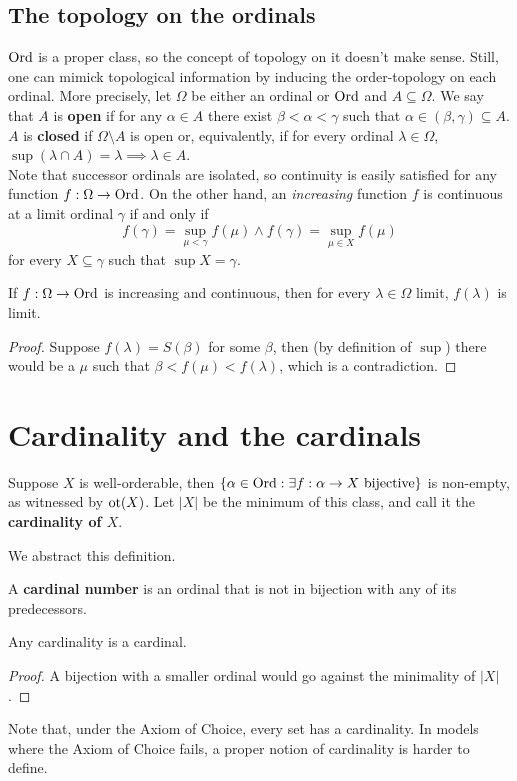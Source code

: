 \documentclass[twoside,openright,titlepage,numbers=noenddot,%
               headinclude,footinclude,cleardoublepage=empty,abstract=on,
               BCOR=23mm,paper=letter,fontsize=11pt
               ]{scrreprt}
\begin{document}
\subsection{The topology on the ordinals}
$\mathrm{Ord}$ is a proper class, so the concept of topology on it doesn't make sense. Still, one can mimick topological information by inducing the order-topology on each ordinal. More precisely, let $\Omega$ be either an ordinal or $\mathrm{Ord}$ and $A \subseteq \Omega$. We say that $A$ is \textbf{open} if for any $\alpha \in A$ there exist $\beta < \alpha < \gamma$ such that $\alpha \in (\beta, \gamma) \subseteq A$. $A$ is \textbf{closed} if $\Omega \setminus A$ is open or, equivalently, if for every ordinal $\lambda \in \Omega$, $\sup(\lambda \cap A) = \lambda \implies \lambda \in A$. \\
Note that successor ordinals are isolated, so continuity is easily satisfied for any function $f: \Omega \to \mathrm{Ord}$. On the other hand, an \textit{increasing} function $f$ is continuous at a limit ordinal $\gamma$ if and only if
    \[ f(\gamma) = \sup_{\mu < \gamma} f(\mu) \land f(\gamma) = \sup_{\mu \in X} f(\mu) \]
for every $X \subseteq \gamma$ such that $\sup X = \gamma$.
\begin{corollary}
    If $f: \Omega \to \mathrm{Ord}$ is increasing and continuous, then for every $\lambda \in \Omega$ limit, $f(\lambda)$ is limit.
\end{corollary}
\begin{proof}
    Suppose $f(\lambda) = S(\beta)$ for some $\beta$, then (by definition of $\sup$) there would be a $\mu$ such that $\beta < f(\mu) < f(\lambda)$, which is a contradiction.
\end{proof}
\section{Cardinality and the cardinals}
\begin{definition}
    Suppose $X$ is well-orderable, then $\{\alpha \in \mathrm{Ord}: \exists f: \alpha \to X \ \text{bijective}\}$ is non-empty, as witnessed by $\mathrm{ot}(X)$. Let $\vert X \vert$ be the minimum of this class, and call it the \textbf{cardinality of $X$}.
\end{definition}
We abstract this definition.
\begin{definition}
    A \textbf{cardinal number} is an ordinal that is not in bijection with any of its predecessors.
\end{definition}
\begin{proposition}
    Any cardinality is a cardinal.
\end{proposition}
\begin{proof}
    A bijection with a smaller ordinal would go against the minimality of $\vert X \vert$.
\end{proof}
Note that, under the Axiom of Choice, every set has a cardinality. In models where the Axiom of Choice fails, a proper notion of cardinality is harder to define.
\end{document}
